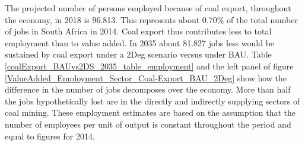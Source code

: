 \documentclass[12pt,english]{article}
\begin{document}

The projected number of persons employed because of coal export, throughout the economy, in 2018 is 96.813. This represents about 0.70\% of the total number of jobs in South Africa in 2014. Coal export thus contributes less to total employment than to value added. In 2035 about 81.827 jobs less would be sustained by coal export under a 2Deg scenario versus under BAU. Table \ref{coalExport_BAUvs2DS_2035_table_employment} and the left panel of figure \ref{ValueAdded_Employment_Sector_Coal-Export_BAU_2Deg} show how the difference in the number of jobs decomposes over the economy. More than half the jobs hypothetically lost are in the directly and indirectly supplying sectors of coal mining. These employment estimates are based on the assumption that the number of employees per unit of output is constant throughout the period and equal to figures for 2014. 
\end{document}
